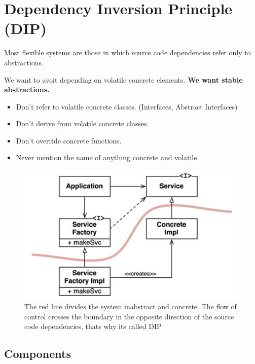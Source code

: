 \documentclass[../Main.tex]{subfiles}
\begin{document}
\section{Dependency Inversion Principle (DIP)}
Most flexible systems are those in which source code dependencies refer only to abstractions.

We want to avoit depending on volatile concrete elements.
\textbf{We want stable abstractions.}

\begin{itemize}
    \item Don't refer to volatile concrete classes. (Interfaces, Abstract Interfaces)
    \item Don't derive from volatile concrete classes.
    \item Don't override concrete functions.
    \item Never mention the name of anything concrete and volatile.
\end{itemize}

\begin{figure}[H]
    \centering
    \includegraphics[width=0.75\linewidth]{Images/cleanarch/dip-factory.png}
    \caption{The red line divides the system inabstract and concrete. The flow of control crosses
        the boundary in the opposite direction of the source code dependencies, thats why its called DIP}
\end{figure}

\subsection{Components}

\end{document}
